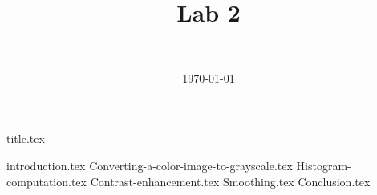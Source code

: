 \documentclass[final]{report} %
\title{Lab 2}
\author{~}
\date{\today}
\begin{document}

{title.tex}
\newpage
\tableofcontents

\newpage
{}
{introduction.tex}
{Converting-a-color-image-to-grayscale.tex}
{Histogram-computation.tex}
{Contrast-enhancement.tex}
{Smoothing.tex}
{Conclusion.tex}
\newpage
{}

\printbibliography
\end{document}
